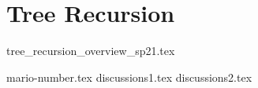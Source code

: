 \documentclass{exam}
\begin{document}
\pagebreak

\section{Tree Recursion}
{tree_recursion_overview_sp21.tex}
\pagebreak
\begin{questions}
{mario-number.tex}
\pagebreak
{discussions1.tex}
\pagebreak
{discussions2.tex}
\end{questions}
\end{document}

